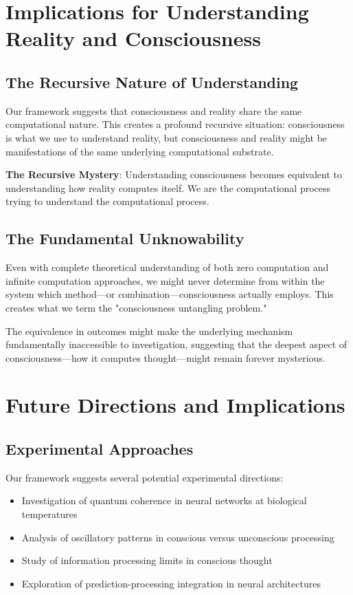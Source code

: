 \documentclass[12pt]{article}
\begin{document}
\section{Implications for Understanding Reality and Consciousness}

\subsection{The Recursive Nature of Understanding}

Our framework suggests that consciousness and reality share the same computational nature. This creates a profound recursive situation: consciousness is what we use to understand reality, but consciousness and reality might be manifestations of the same underlying computational substrate.

\textbf{The Recursive Mystery}: Understanding consciousness becomes equivalent to understanding how reality computes itself. We are the computational process trying to understand the computational process.

\subsection{The Fundamental Unknowability}

Even with complete theoretical understanding of both zero computation and infinite computation approaches, we might never determine from within the system which method—or combination—consciousness actually employs. This creates what we term the "consciousness untangling problem."

The equivalence in outcomes might make the underlying mechanism fundamentally inaccessible to investigation, suggesting that the deepest aspect of consciousness—how it computes thought—might remain forever mysterious.

\section{Future Directions and Implications}

\subsection{Experimental Approaches}

Our framework suggests several potential experimental directions:

\begin{itemize}
\item Investigation of quantum coherence in neural networks at biological temperatures
\item Analysis of oscillatory patterns in conscious versus unconscious processing
\item Study of information processing limits in conscious thought
\item Exploration of prediction-processing integration in neural architectures
\end{itemize}
\end{document}
